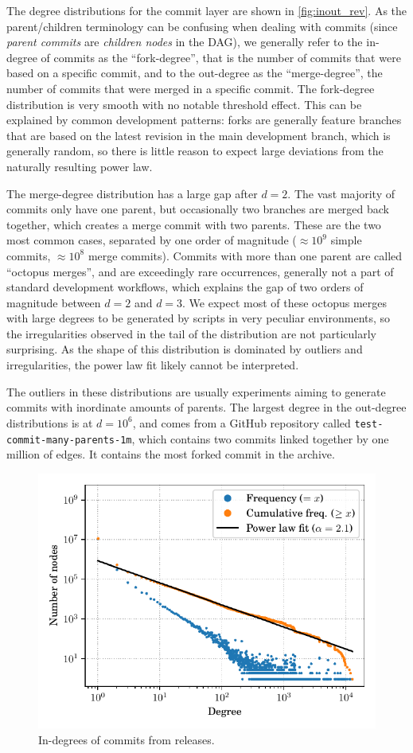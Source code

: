 The degree distributions for the commit layer are shown in
\cref{fig:inout_rev}.
As the parent/children terminology can be confusing when dealing with commits
(since \emph{parent commits} are \emph{children nodes} in the DAG), we
generally refer to the in-degree of commits as the ``fork-degree'', that is the
number of commits that were based on a specific commit, and to the out-degree as
the ``merge-degree'', the number of commits that were merged in a specific
commit.
The fork-degree distribution is very smooth with no notable threshold effect.
This can be explained by common development patterns: forks are generally
feature branches that are based on the latest revision in the main development
branch, which is generally random, so there is little reason to expect large
deviations from the naturally resulting power law.

The merge-degree distribution has a large gap after $d = 2$. The
vast majority of commits only have one parent, but occasionally two branches
are merged back together, which creates a merge commit with two parents. These
are the two most common cases, separated by one order of magnitude ($\approx
10^9$ simple commits, $\approx 10^8$ merge commits).
Commits with more than one parent are called ``octopus merges'', and are
exceedingly rare occurrences, generally not a part of standard development
workflows, which explains the gap of two orders of magnitude between $d = 2$
and $d = 3$. We expect most of these octopus merges with large degrees to be
generated by scripts in very peculiar environments, so the irregularities
observed in the tail of the distribution are not particularly surprising.
As the shape of this distribution is dominated by outliers and irregularities,
the power law fit likely cannot be interpreted.

The outliers in these distributions are usually experiments aiming to generate
commits with inordinate amounts of parents. The largest degree in the out-degree
distributions is at $d = 10^6$, and comes from a GitHub repository called
\texttt{test-commit-many-parents-1m}, which contains two commits linked
together by one million of edges. It contains the most forked commit in the
archive.


\begin{figure}
    \centering
    \includegraphics[width=.49\textwidth]{img/topology/inout/rev_in_rel}
    \caption{In-degrees of commits from releases.}
    \label{fig:inout_rev_in_rel}
\end{figure}

